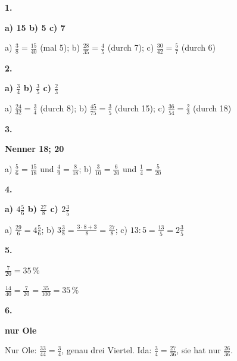 \documentclass[11pt]{article}
\newcommand{\lsg}[3]{\par\noindent\begin{minipage}[t]{9mm}\textbf{#1}\end{minipage}%
  \begin{minipage}[t]{52mm}\raggedright\bfseries\boldmath #2\end{minipage}\hspace{3mm}%
  \begin{minipage}[t]{\dimexpr\linewidth-64mm\relax}\raggedright\small #3\end{minipage}\par\vspace{4pt}}
\begin{document}
\par\Needspace{25mm}\vspace{6pt}\noindent\colorbox{black!12}{}\hspace{2mm}{\bfseries Probetest}\par\vspace{4pt}
\lsg{1.}{a) 15 \quad b) 5 \quad c) 7}{a) $\frac{3}{8} = \frac{15}{40}$ (mal 5); b) $\frac{28}{35} = \frac{4}{5}$ (durch 7); c) $\frac{30}{42} = \frac{5}{7}$ (durch 6)}
\lsg{2.}{a) $\frac{3}{4}$ \quad b) $\frac{3}{5}$ \quad c) $\frac{2}{3}$}{a) $\frac{24}{32} = \frac{3}{4}$ (durch 8); b) $\frac{45}{75} = \frac{3}{5}$ (durch 15); c) $\frac{36}{54} = \frac{2}{3}$ (durch 18)}
\lsg{3.}{Nenner 18; 20}{a) $\frac{5}{6} = \frac{15}{18}$ und $\frac{4}{9} = \frac{8}{18}$; b) $\frac{3}{10} = \frac{6}{20}$ und $\frac{1}{4} = \frac{5}{20}$}
\lsg{4.}{a) $4\frac{5}{6}$ \quad b) $\frac{27}{8}$ \quad c) $2\frac{3}{5}$}{a) $\frac{29}{6} = 4\frac{5}{6}$; b) $3\frac{3}{8} = \frac{3 \cdot 8 + 3}{8} = \frac{27}{8}$; c) $13 : 5 = \frac{13}{5} = 2\frac{3}{5}$}
\lsg{5.}{$\frac{7}{20} = 35\,\%$}{$\frac{14}{40} = \frac{7}{20} = \frac{35}{100} = 35\,\%$}
\lsg{6.}{nur Ole}{Nur Ole: $\frac{33}{44} = \frac{3}{4}$, genau drei Viertel. Ida: $\frac{3}{4} = \frac{27}{36}$, sie hat nur $\frac{26}{36}$.}
\end{document}
